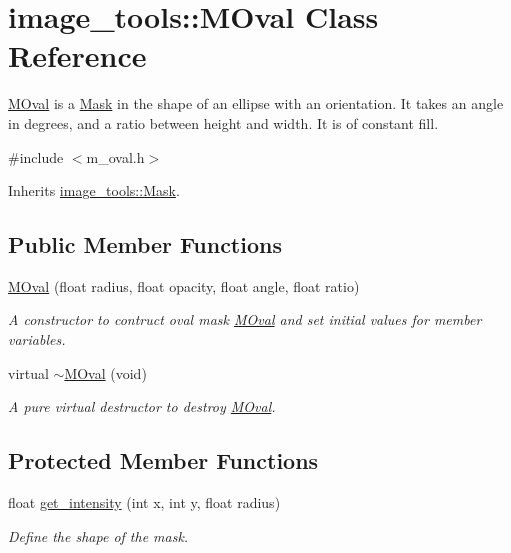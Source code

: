 \hypertarget{classimage__tools_1_1MOval}{}\section{image\+\_\+tools\+:\+:M\+Oval Class Reference}
\label{classimage__tools_1_1MOval}


\hyperlink{classimage__tools_1_1MOval}{M\+Oval} is a \hyperlink{classimage__tools_1_1Mask}{Mask} in the shape of an ellipse with an orientation. It takes an angle in degrees, and a ratio between height and width. It is of constant fill.  




{\ttfamily \#include $<$m\+\_\+oval.\+h$>$}



Inherits \hyperlink{classimage__tools_1_1Mask}{image\+\_\+tools\+::\+Mask}.

\subsection*{Public Member Functions}
\begin{DoxyCompactItemize}
\item 
\hyperlink{classimage__tools_1_1MOval_a07eb3a42c66b79837d5969310b7873ff}{M\+Oval} (float radius, float opacity, float angle, float ratio)\hypertarget{classimage__tools_1_1MOval_a07eb3a42c66b79837d5969310b7873ff}{}\label{classimage__tools_1_1MOval_a07eb3a42c66b79837d5969310b7873ff}

\begin{DoxyCompactList}\small\item\em A constructor to contruct oval mask \hyperlink{classimage__tools_1_1MOval}{M\+Oval} and set initial values for member variables. \end{DoxyCompactList}\item 
virtual \hyperlink{classimage__tools_1_1MOval_a9747759b1b62cf3846e7717f0b41384f}{$\sim$\+M\+Oval} (void)\hypertarget{classimage__tools_1_1MOval_a9747759b1b62cf3846e7717f0b41384f}{}\label{classimage__tools_1_1MOval_a9747759b1b62cf3846e7717f0b41384f}

\begin{DoxyCompactList}\small\item\em A pure virtual destructor to destroy \hyperlink{classimage__tools_1_1MOval}{M\+Oval}. \end{DoxyCompactList}\end{DoxyCompactItemize}
\subsection*{Protected Member Functions}
\begin{DoxyCompactItemize}
\item 
float \hyperlink{classimage__tools_1_1MOval_ae7767ec154487373d5944f2a02a834f0}{get\+\_\+intensity} (int x, int y, float radius)
\begin{DoxyCompactList}\small\item\em Define the shape of the mask. \end{DoxyCompactList}\end{DoxyCompactItemize}

